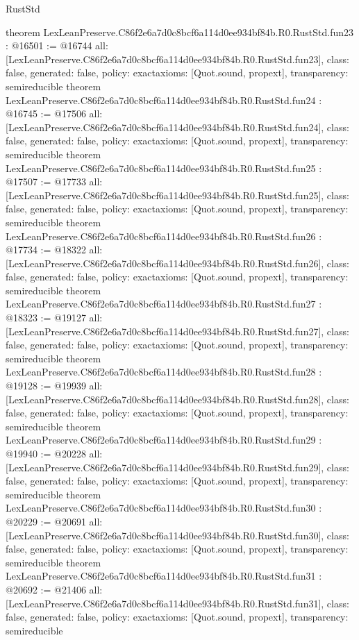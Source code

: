 \begin{lexlean}{RustStd}
\begin{coremodule}
{}
theorem LexLeanPreserve.C86f2e6a7d0c8bcf6a114d0ee934bf84b.R0.RustStd.fun23 : @16501 := @16744 {
  all: [LexLeanPreserve.C86f2e6a7d0c8bcf6a114d0ee934bf84b.R0.RustStd.fun23],
  class: false,
  generated: false,
  policy: exact{axioms: [Quot.sound, propext]},
  transparency: semireducible
}
theorem LexLeanPreserve.C86f2e6a7d0c8bcf6a114d0ee934bf84b.R0.RustStd.fun24 : @16745 := @17506 {
  all: [LexLeanPreserve.C86f2e6a7d0c8bcf6a114d0ee934bf84b.R0.RustStd.fun24],
  class: false,
  generated: false,
  policy: exact{axioms: [Quot.sound, propext]},
  transparency: semireducible
}
theorem LexLeanPreserve.C86f2e6a7d0c8bcf6a114d0ee934bf84b.R0.RustStd.fun25 : @17507 := @17733 {
  all: [LexLeanPreserve.C86f2e6a7d0c8bcf6a114d0ee934bf84b.R0.RustStd.fun25],
  class: false,
  generated: false,
  policy: exact{axioms: [Quot.sound, propext]},
  transparency: semireducible
}
theorem LexLeanPreserve.C86f2e6a7d0c8bcf6a114d0ee934bf84b.R0.RustStd.fun26 : @17734 := @18322 {
  all: [LexLeanPreserve.C86f2e6a7d0c8bcf6a114d0ee934bf84b.R0.RustStd.fun26],
  class: false,
  generated: false,
  policy: exact{axioms: [Quot.sound, propext]},
  transparency: semireducible
}
theorem LexLeanPreserve.C86f2e6a7d0c8bcf6a114d0ee934bf84b.R0.RustStd.fun27 : @18323 := @19127 {
  all: [LexLeanPreserve.C86f2e6a7d0c8bcf6a114d0ee934bf84b.R0.RustStd.fun27],
  class: false,
  generated: false,
  policy: exact{axioms: [Quot.sound, propext]},
  transparency: semireducible
}
theorem LexLeanPreserve.C86f2e6a7d0c8bcf6a114d0ee934bf84b.R0.RustStd.fun28 : @19128 := @19939 {
  all: [LexLeanPreserve.C86f2e6a7d0c8bcf6a114d0ee934bf84b.R0.RustStd.fun28],
  class: false,
  generated: false,
  policy: exact{axioms: [Quot.sound, propext]},
  transparency: semireducible
}
theorem LexLeanPreserve.C86f2e6a7d0c8bcf6a114d0ee934bf84b.R0.RustStd.fun29 : @19940 := @20228 {
  all: [LexLeanPreserve.C86f2e6a7d0c8bcf6a114d0ee934bf84b.R0.RustStd.fun29],
  class: false,
  generated: false,
  policy: exact{axioms: [Quot.sound, propext]},
  transparency: semireducible
}
theorem LexLeanPreserve.C86f2e6a7d0c8bcf6a114d0ee934bf84b.R0.RustStd.fun30 : @20229 := @20691 {
  all: [LexLeanPreserve.C86f2e6a7d0c8bcf6a114d0ee934bf84b.R0.RustStd.fun30],
  class: false,
  generated: false,
  policy: exact{axioms: [Quot.sound, propext]},
  transparency: semireducible
}
theorem LexLeanPreserve.C86f2e6a7d0c8bcf6a114d0ee934bf84b.R0.RustStd.fun31 : @20692 := @21406 {
  all: [LexLeanPreserve.C86f2e6a7d0c8bcf6a114d0ee934bf84b.R0.RustStd.fun31],
  class: false,
  generated: false,
  policy: exact{axioms: [Quot.sound, propext]},
  transparency: semireducible
}
\end{coremodule}
\end{lexlean}
